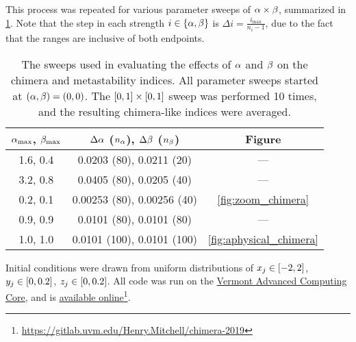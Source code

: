 This process was repeated for various parameter sweeps of $\alpha \times \beta$, summarized in \cref{tab:parameter_sweeps}.
Note that the step in each strength $i \in \Bqty{\hra, \hrb}$ is $\Delta i = \frac{i_{\text{max}}}{n_{i} - 1}$, due to the fact that the ranges are inclusive of both endpoints.
\begin{table}[ht]
  \centering
  \begin{tabular}{c | c | c}
    $\alpha_{\text{max}}$, $\beta_{\text{max}}$ & $\Delta \alpha$ ($n_{\alpha}$), $\Delta \beta$ ($n_{\beta}$) & Figure \\ \hline
    1.6, 0.4 & 0.0203 (80), 0.0211 (20) & --- \\
    3.2, 0.8 & 0.0405 (80), 0.0205 (40) & --- \\
    0.2, 0.1 & 0.00253 (80), 0.00256 (40) & \cref{fig:zoom_chimera} \\
    0.9, 0.9 & 0.0101 (80), 0.0101 (80) & --- \\
    1.0, 1.0 & 0.0101 (100), 0.0101 (100) & \cref{fig:aphysical_chimera}
  \end{tabular}
  \caption[Parameter sweeps]{The sweeps used in evaluating the effects of $\alpha$ and $\beta$ on the chimera and metastability indices.
    All parameter sweeps started at $(\alpha, \beta) = (0, 0)$.
    The $\bqty{0, 1} \times \bqty{0, 1}$ sweep was performed 10 times, and the resulting chimera-like indices were averaged.
  }
  \label{tab:parameter_sweeps}
\end{table}

Initial conditions were drawn from uniform distributions of $x_{j} \in \bqty{-2, 2}$, $y_{j} \in \bqty{0, 0.2}$, $z_{j} \in \bqty{0, 0.2}$.
All code was run on the \href{https://www.uvm.edu/vacc}{Vermont Advanced Computing Core}, and is \href{https://gitlab.uvm.edu/Henry.Mitchell/chimera-2019}{available online}\footnote{\href{https://gitlab.uvm.edu/Henry.Mitchell/chimera-2019}{https://gitlab.uvm.edu/Henry.Mitchell/chimera-2019}}.

